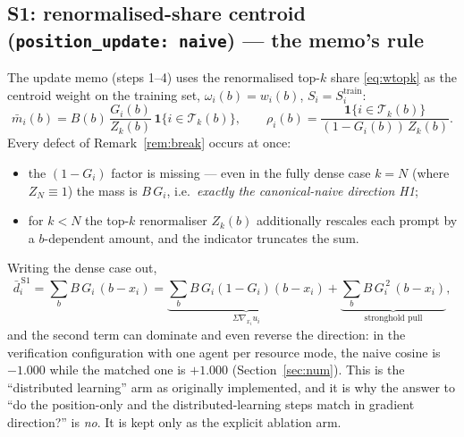 \documentclass[11pt]{article}
\theoremstyle{remark}
\newcommand{\ind}[1]{\mathbf{1}\{#1\}}
\newcommand{\Sig}{\Sigma}
\newcommand{\Tk}{\mathcal{T}_k}
\newcommand{\cfg}[1]{\texttt{#1}}
\begin{document}
\subsection{S1: renormalised-share centroid (\cfg{position\_update: naive}) --- the memo's rule}
The update memo (steps 1--4) uses the renormalised top-$k$ share
\eqref{eq:wtopk} as the centroid weight on the training set,
$\omega_i(b)=w_i(b)$, $S_i=S_i^{\mathrm{train}}$:
\begin{equation}
  \bar m_i(b)=B(b)\,\frac{G_i(b)}{Z_k(b)}\,\ind{i\in\Tk(b)},
  \qquad
  \rho_i(b)=\frac{\ind{i\in\Tk(b)}}{(1-G_i(b))\,Z_k(b)} .
  \label{eq:S1}
\end{equation}
Every defect of Remark~\ref{rem:break} occurs at once:
\begin{itemize}
\item the $(1-G_i)$ factor is missing --- even in the fully dense case
  $k=N$ (where $Z_N\equiv1$) the mass is $B\,G_i$, i.e.\ \emph{exactly the
  canonical-naive direction H1};
\item for $k<N$ the top-$k$ renormaliser $Z_k(b)$ additionally rescales each
  prompt by a $b$-dependent amount, and the indicator truncates the sum.
\end{itemize}
Writing the dense case out,
\[
  \bar d_i^{\,\mathrm{S1}} = \sum_b B\,G_i\,(b-x_i)
  = \underbrace{\sum_b B\,G_i(1-G_i)(b-x_i)}_{\Sig\nabla_{x_i}u_i}
   + \underbrace{\sum_b B\,G_i^{\,2}\,(b-x_i)}_{\text{stronghold pull}} ,
\]
and the second term can dominate and even reverse the direction: in the
verification configuration with one agent per resource mode, the naive
cosine is $-1.000$ while the matched one is $+1.000$ (Section~\ref{sec:num}).
This is the ``distributed learning'' arm as originally implemented, and it is
why the answer to ``do the position-only and the distributed-learning steps
match in gradient direction?'' is \emph{no}. It is kept only as the
explicit ablation arm.
\end{document}
